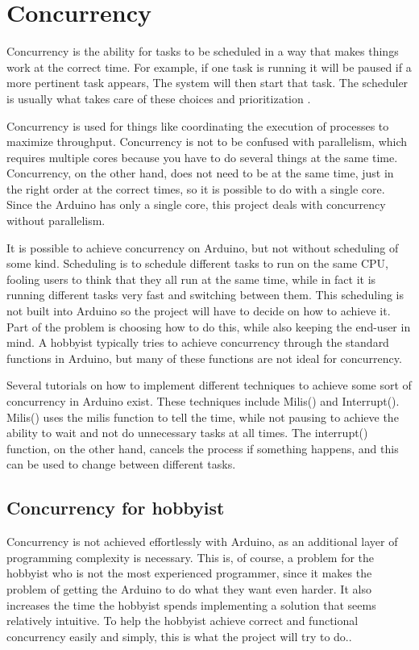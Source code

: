\section{Concurrency}\label{sec:concurrency}
Concurrency is the ability for tasks to be scheduled in a way that makes things work at the correct time. For example, if one task is running it will be paused if a more pertinent task appears, The system will then start that task. The scheduler is usually what takes care of these choices and prioritization \cite{Bryant2016}. 

Concurrency is used for things like coordinating the execution of processes to maximize throughput. Concurrency is not to be confused with parallelism, which requires multiple cores because you have to do several things at the same time. Concurrency, on the other hand, does not need to be at the same time, just in the right order at the correct times, so it is possible to do with a single core. Since the Arduino has only a single core, this project deals with concurrency without parallelism.

It is possible to achieve concurrency on Arduino, but not without scheduling of some kind. Scheduling is to schedule different tasks to run on the same CPU, fooling users to think that they all run at the same time, while in fact it is running different tasks very fast and switching between them. This scheduling is not built into Arduino so the project will have to decide on how to achieve it. Part of the problem is choosing how to do this, while also keeping the end-user in mind. A hobbyist typically tries to achieve concurrency through the standard functions in Arduino, but many of these functions are not ideal for concurrency.

Several tutorials on how to implement different techniques to achieve some sort of concurrency in Arduino exist. These techniques include Milis() and Interrupt(). Milis() uses the milis function to tell the time, while not pausing to achieve the ability to wait and not do unnecessary tasks at all times. The interrupt() function, on the other hand, cancels the process if something happens, and this can be used to change between different tasks.


\subsection{Concurrency for hobbyist} 
Concurrency is not achieved effortlessly with Arduino, as an additional layer of programming complexity is necessary. This is, of course, a problem for the hobbyist who is not the most experienced programmer, since it makes the problem of getting the Arduino to do what they want even harder. It also increases the time the hobbyist spends implementing a solution that seems relatively intuitive. To help the hobbyist achieve correct and functional concurrency easily and simply, this is what the project will try to do..